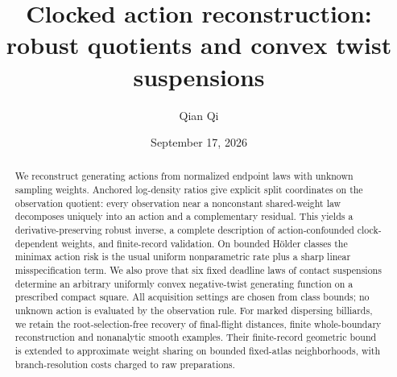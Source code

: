 
\title[Clocked action reconstruction]{Clocked action reconstruction:\\ robust quotients and convex twist suspensions}
\author{Qian Qi}
\date{September 17, 2026}

\begin{abstract}
We reconstruct generating actions from normalized endpoint laws with
unknown sampling weights.  Anchored log-density ratios give explicit
split coordinates on the observation quotient: every observation near
a nonconstant shared-weight law decomposes uniquely into an action and
a complementary residual.  This yields a derivative-preserving robust
inverse, a complete description of action-confounded clock-dependent
weights, and finite-record validation.  On bounded H\"older classes the
minimax action risk is the usual uniform nonparametric rate plus a sharp
linear misspecification term.  We also prove that six fixed deadline
laws of contact suspensions determine an arbitrary uniformly convex
negative-twist generating function on a prescribed compact square.
All acquisition settings are chosen from class bounds; no unknown action
is evaluated by the observation rule.  For marked dispersing billiards,
we retain the root-selection-free recovery of final-flight distances,
finite whole-boundary reconstruction and nonanalytic smooth examples.
Their finite-record geometric bound is extended to approximate weight
sharing on bounded fixed-atlas neighborhoods, with branch-resolution
costs charged to raw preparations.
\end{abstract}
\maketitle
\setcounter{tocdepth}{1}
\tableofcontents















